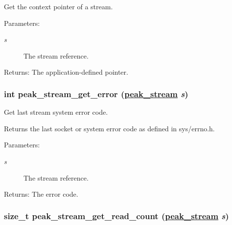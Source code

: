 Get the context pointer of a stream. 

\begin{Desc}
\item[Parameters:]
\begin{description}
\item[{\em s}]The stream reference.\end{description}
\end{Desc}
\begin{Desc}
\item[Returns:]The application-defined pointer. \end{Desc}
\hypertarget{group__stream__common_ga4}{
\subsubsection[peak\_\-stream\_\-get\_\-error]{\setlength{\rightskip}{0pt plus 5cm}int peak\_\-stream\_\-get\_\-error (\hyperlink{group__stream_ga0}{peak\_\-stream} {\em s})}}
\label{group__stream__common_ga4}


Get last stream system error code. 

Returns the last socket or system error code as defined in sys/errno.h.

\begin{Desc}
\item[Parameters:]
\begin{description}
\item[{\em s}]The stream reference.\end{description}
\end{Desc}
\begin{Desc}
\item[Returns:]The error code. \end{Desc}
\hypertarget{group__stream__common_ga11}{
\subsubsection[peak\_\-stream\_\-get\_\-read\_\-count]{\setlength{\rightskip}{0pt plus 5cm}size\_\-t peak\_\-stream\_\-get\_\-read\_\-count (\hyperlink{group__stream_ga0}{peak\_\-stream} {\em s})}}
\label{group__stream__common_ga11}


